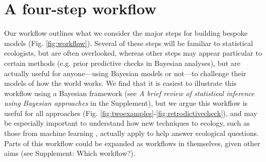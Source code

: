\documentclass[11pt]{article}
\begin{document}

\section*{A four-step workflow}

Our workflow outlines what we consider the major steps for building bespoke models (Fig. \ref{fig:workflow}). Several of these steps will be familiar to statistical ecologists, but are often overlooked, whereas other steps may appear particular to certain methods (e.g. prior predictive checks in Bayesian analyses), but are actually useful for anyone---using Bayesian models or not---to challenge their models of how the world works. We find that it is easiest to illustrate this workflow using a Bayesian framework (see \emph{A brief review of statistical inference using Bayesian approaches} in the Supplement), but we argue this workflow is useful for all approaches (Fig. \ref{fig:twoexamples}-\ref{fig:retrodictivecheck}), and may be especially important to understand how new techniques to ecology, such as those from machine learning \citep{pichler2023machine}, actually apply to help answer ecological questions.
Parts of this workflow could be expanded as workflows in themselves, given other aims (see Supplement: Which workflow?). %
\end{document}
